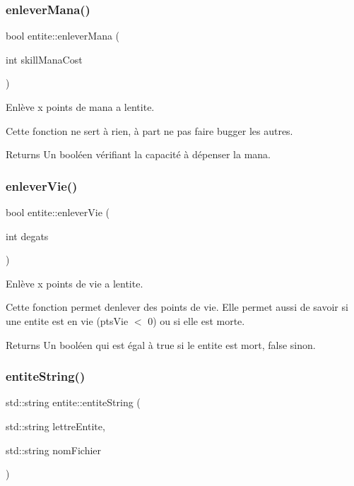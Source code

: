 \subsubsection{\texorpdfstring{enlever\+Mana()}{enleverMana()}}
{\footnotesize\ttfamily bool entite\+::enlever\+Mana (\begin{DoxyParamCaption}\item[{int}]{skill\+Mana\+Cost }\end{DoxyParamCaption})}



Enlève x points de mana a l\textquotesingle{}entite. 

Cette fonction ne sert à rien, à part ne pas faire bugger les autres. \begin{DoxyReturn}{Returns}
Un booléen vérifiant la capacité à dépenser la mana. 
\end{DoxyReturn}
\mbox{\label{classentite_a024cbcffabd07556d550f5941f2113d4}} 
\subsubsection{\texorpdfstring{enlever\+Vie()}{enleverVie()}}
{\footnotesize\ttfamily bool entite\+::enlever\+Vie (\begin{DoxyParamCaption}\item[{int}]{degats }\end{DoxyParamCaption})}



Enlève x points de vie a l\textquotesingle{}entite. 

Cette fonction permet d\textquotesingle{}enlever des points de vie. Elle permet aussi de savoir si une entite est en vie (pts\+Vie $<$ 0) ou si elle est morte. \begin{DoxyReturn}{Returns}
Un booléen qui est égal à {\ttfamily true} si le entite est mort, {\ttfamily false} sinon. 
\end{DoxyReturn}
\mbox{\label{classentite_aef8675e5f8592e0cc56661d4d5827d1f}} 
\subsubsection{\texorpdfstring{entite\+String()}{entiteString()}}
{\footnotesize\ttfamily std\+::string entite\+::entite\+String (\begin{DoxyParamCaption}\item[{std\+::string}]{lettre\+Entite,  }\item[{std\+::string}]{nom\+Fichier }\end{DoxyParamCaption})}

